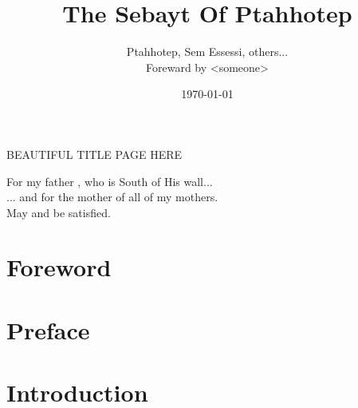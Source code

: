 \documentclass[a4paper,pagesize,8pt,pointlessnumbers,normalheadings,oneside]{book}
\title{The Sebayt Of Ptahhotep}
\author{Ptahhotep, Sem Essessi, others...\\Foreward by <someone>}
\date{\today}
\begin{document}
\maketitle

BEAUTIFUL TITLE PAGE HERE
\pagebreak

\vspace*{\fill}
\begin{center}
For my father , who is South of His wall...\\
\vspace{7.5mm}
... and for  the mother of all of my mothers.\\
\vspace{15mm}
May  and  be satisfied.\\
\end{center}
\vspace*{\fill}

\tableofcontents

\markboth{}{}

\newlength\q
\setlength{}

\chapter*{Foreword}

\markboth{}{}

\chapter*{Preface}

\markboth{}{}

\chapter*{Introduction}


\pagebreak

\printindex
\end{document}
